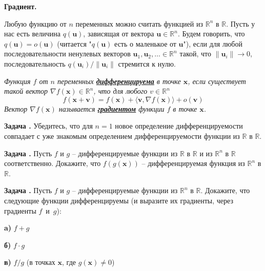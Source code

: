 \documentclass[12pt,a4paper]{article}
\def\R{\mathbb{R}}
\newcounter{znum}
\newcommand{\zz}[1]{\addtocounter{znum}{1} \textbf{Задача \arabic{znum}#1. }}
\begin{document}
\pagestyle{empty}

\begin{center} \Large \textbf{Градиент.}
\end{center}

Любую функцию от $n$ переменных можно считать функцией из $\R^n$ в $\R$. 
Пусть у нас есть величина $q(\mathbf{u})$, зависящая от вектора $\mathbf{u} \in \R^n$. Будем говорить, что $q(\mathbf{u}) = o(\mathbf{u})$ (читается "$q(\mathbf{u})$ есть о маленькое от $\mathbf{u}$"), если для любой последовательности ненулевых векторов $\mathbf{u}_1, \mathbf{u}_2, \ldots \in \R^n$ такой, что $\|\mathbf{u}_i\| \to 0$, последовательность $q(\mathbf{u}_i) / \| \mathbf{u}_i\|$ стремится к нулю.


{\it Функция $f$ от $n$ переменных \textbf{\href{https://ru.wikipedia.org/wiki/\%D0\%94\%D0\%B8\%D1\%84\%D1\%84\%D0\%B5\%D1\%80\%D0\%B5\%D0\%BD\%D1\%86\%D0\%B8\%D1\%80\%D1\%83\%D0\%B5\%D0\%BC\%D0\%B0\%D1\%8F_\%D1\%84\%D1\%83\%D0\%BD\%D0\%BA\%D1\%86\%D0\%B8\%D1\%8F\#\%D0\%A4\%D1\%83\%D0\%BD\%D0\%BA\%D1\%86\%D0\%B8\%D0\%B8_\%D0\%BD\%D0\%B5\%D1\%81\%D0\%BA\%D0\%BE\%D0\%BB\%D1\%8C\%D0\%BA\%D0\%B8\%D1\%85_\%D0\%BF\%D0\%B5\%D1\%80\%D0\%B5\%D0\%BC\%D0\%B5\%D0\%BD\%D0\%BD\%D1\%8B\%D1\%85}{дифференцируема}} в точке $\mathbf{x}$, если существует такой вектор $\nabla f(\mathbf{x}) \in \R^n$, что для любого $v \in \R^n$
$$ f(\mathbf{x} + \mathbf{v}) = f(\mathbf{x}) + \langle \mathbf{v}, \nabla f(\mathbf{x}) \rangle + o(\mathbf{v})$$
Вектор $\nabla f(\mathbf{x})$ называется \textbf{\href{https://ru.wikipedia.org/wiki/\%D0\%93\%D1\%80\%D0\%B0\%D0\%B4\%D0\%B8\%D0\%B5\%D0\%BD\%D1\%82}{градиентом}} функции $f$ в точке $\mathbf{x}$.
}

\zz{} Убедитесь, что для $n=1$ новое определение дифференцируемости совпадает с уже знакомым определением дифференцируемости функции из $\R$ в $\R$.

\zz{} Пусть $f$ и $g$ -- дифференцируемые функции из $\R$ в $\R$ и из $\R^n$ в $\R$ соответственно. Докажите, что $f(g(\mathbf{x}))$ -- дифференцируемая функция из $\R^n$  в $\R$.

\zz{} Пусть $f$ и $g$ -- дифференцируемые функции из $\R^n$ в $\R$. Докажите, что следующие функции дифференцируемы (и выразите их градиенты, через градиенты $f$~и~$g$):\par
\textbf{a)} $f + g$ \par
\textbf{б)} $f \cdot g$ \par
\textbf{в)} $f / g$ (в точках $\mathbf{x}$, где $g(\mathbf{x}) \ne 0$)
\end{document}
